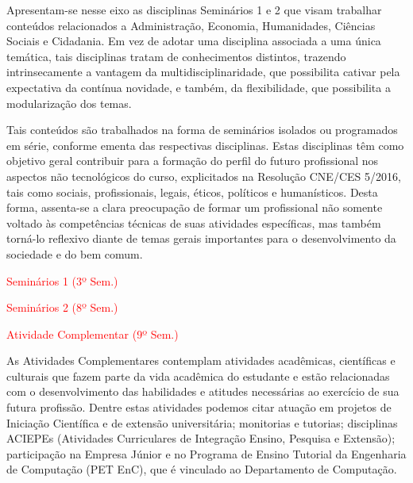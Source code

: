 Apresentam-se nesse eixo as disciplinas Seminários 1 e 2 que visam trabalhar conteúdos relacionados a Administração, Economia, Humanidades, Ciências Sociais e Cidadania. Em vez de adotar uma disciplina associada a uma única temática, tais disciplinas tratam de conhecimentos distintos, trazendo intrinsecamente a vantagem da multidisciplinaridade, que possibilita cativar pela expectativa da contínua novidade, e também, da flexibilidade, que possibilita a modularização dos temas.

Tais conteúdos são trabalhados na forma de seminários isolados ou programados em série, conforme ementa das respectivas disciplinas. Estas disciplinas têm como objetivo geral contribuir para a formação do perfil do futuro profissional nos aspectos não tecnológicos do curso, explicitados na Resolução CNE/CES 5/2016, tais como sociais, profissionais, legais, éticos, políticos e humanísticos. Desta forma, assenta-se a clara preocupação de formar um profissional não somente voltado às competências técnicas de suas atividades específicas, mas também torná-lo reflexivo diante de temas gerais importantes para o desenvolvimento da sociedade e do bem comum.

\textcolor{red}{\begin{compenum}
    \item Seminários 1 (3º Sem.)
    \item Seminários 2 (8º Sem.)
    \item Atividade Complementar (9º Sem.)
\end{compenum}}

As Atividades Complementares contemplam atividades acadêmicas, científicas e culturais que fazem parte da vida acadêmica do estudante e estão relacionadas com o desenvolvimento das habilidades e atitudes necessárias ao exercício de sua futura profissão. Dentre estas atividades podemos citar atuação em projetos de Iniciação Científica e de extensão universitária; monitorias e tutorias; disciplinas ACIEPEs (Atividades Curriculares de Integração Ensino, Pesquisa e Extensão); participação na Empresa Júnior e no Programa de Ensino Tutorial da Engenharia de Computação (PET EnC), que é vinculado ao Departamento de Computação. %

